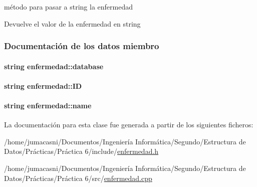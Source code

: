 método para pasar a string la enfermedad 

\begin{DoxyReturn}{Devuelve}
el valor de la enfermedad en string 
\end{DoxyReturn}


\subsubsection{Documentación de los datos miembro}
\paragraph[{\texorpdfstring{database}{database}}]{\setlength{\rightskip}{0pt plus 5cm}string enfermedad\+::database\hspace{0.3cm}{\ttfamily [private]}}\hypertarget{classenfermedad_a3684b7ec850d4c9357dd21bdd5e02803}{}\label{classenfermedad_a3684b7ec850d4c9357dd21bdd5e02803}
\paragraph[{\texorpdfstring{ID}{ID}}]{\setlength{\rightskip}{0pt plus 5cm}string enfermedad\+::\+ID\hspace{0.3cm}{\ttfamily [private]}}\hypertarget{classenfermedad_a689cdbd469ecc28e045bda2f62a229d2}{}\label{classenfermedad_a689cdbd469ecc28e045bda2f62a229d2}
\paragraph[{\texorpdfstring{name}{name}}]{\setlength{\rightskip}{0pt plus 5cm}string enfermedad\+::name\hspace{0.3cm}{\ttfamily [private]}}\hypertarget{classenfermedad_ad7c4204057028a73bde6022678c6813e}{}\label{classenfermedad_ad7c4204057028a73bde6022678c6813e}


La documentación para esta clase fue generada a partir de los siguientes ficheros\+:\begin{DoxyCompactItemize}
\item 
/home/jumacasni/\+Documentos/\+Ingeniería Informática/\+Segundo/\+Estructura de Datos/\+Prácticas/\+Práctica 6/include/\hyperlink{enfermedad_8h}{enfermedad.\+h}\item 
/home/jumacasni/\+Documentos/\+Ingeniería Informática/\+Segundo/\+Estructura de Datos/\+Prácticas/\+Práctica 6/src/\hyperlink{enfermedad_8cpp}{enfermedad.\+cpp}\end{DoxyCompactItemize}

